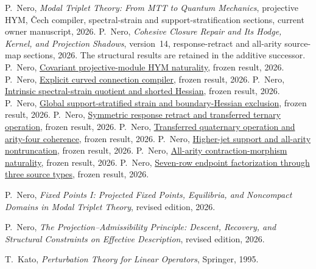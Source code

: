 \documentclass[11pt]{article}
\newcommand{\frozenresult}[2]{\href{https://github.com/PeterNero/mtt-results-repro/blob/f141a20ea23c5c3ff19cc2161c0e226e29ade8a7/release/results/#1/artifact.json}{#2}}
\begin{document}
\begin{thebibliography}{99}

 P.~Nero, \emph{Modal Triplet Theory: From MTT to Quantum Mechanics}, projective HYM, \v{C}ech compiler, spectral-strain and support-stratification sections, current owner manuscript, 2026.
 P.~Nero, \emph{Cohesive Closure Repair and Its Hodge, Kernel, and Projection Shadows}, version~14, response-retract and all-arity source-map sections, 2026. The structural results are retained in the additive successor.
 P.~Nero, \frozenresult{q79_projective_hym_naturality}{Covariant projective-module HYM naturality}, frozen result, 2026.
 P.~Nero, \frozenresult{q79_cech_projector_compiler}{Explicit curved connection compiler}, frozen result, 2026.
 P.~Nero, \frozenresult{q79_spectral_strain_hessian}{Intrinsic spectral-strain quotient and shorted Hessian}, frozen result, 2026.
 P.~Nero, \frozenresult{q79_support_stratified_strain}{Global support-stratified strain and boundary-Hessian exclusion}, frozen result, 2026.
 P.~Nero, \frozenresult{causal_base_q79_symmetric_response_retraction_transferred_m3_packet}{Symmetric response retract and transferred ternary operation}, frozen result, 2026.
 P.~Nero, \frozenresult{causal_base_q79_symmetric_response_transferred_m4_packet}{Transferred quaternary operation and arity-four coherence}, frozen result, 2026.
 P.~Nero, \frozenresult{causal_base_q79_higher_transfer_jet_filtration_and_m5_feasibility_packet}{Higher-jet support and all-arity nontruncation}, frozen result, 2026.
 P.~Nero, \frozenresult{causal_base_q79_all_arity_source_promotion_packet}{All-arity contraction-morphism naturality}, frozen result, 2026.
 P.~Nero, \frozenresult{causal_base_q79_seven_row_endpoint_factorization_packet}{Seven-row endpoint factorization through three source types}, frozen result, 2026.

P.~Nero,
\newblock \emph{Fixed Points I: Projected Fixed Points, Equilibria, and
Noncompact Domains in Modal Triplet Theory},
\newblock revised edition, 2026.

P.~Nero,
\newblock \emph{The Projection--Admissibility Principle: Descent, Recovery,
and Structural Constraints on Effective Description},
\newblock revised edition, 2026.

T.~Kato,
\newblock \emph{Perturbation Theory for Linear Operators},
\newblock Springer, 1995.


\end{thebibliography}
\end{document}
